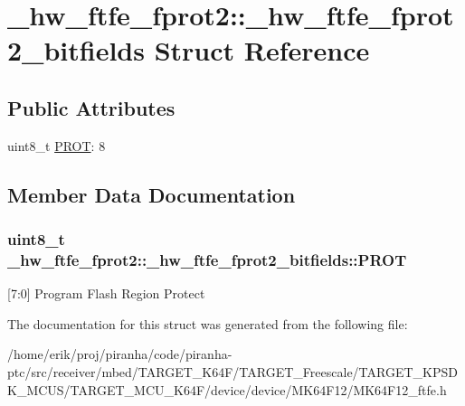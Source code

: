 \hypertarget{struct__hw__ftfe__fprot2_1_1__hw__ftfe__fprot2__bitfields}{}\section{\+\_\+hw\+\_\+ftfe\+\_\+fprot2\+:\+:\+\_\+hw\+\_\+ftfe\+\_\+fprot2\+\_\+bitfields Struct Reference}
\label{struct__hw__ftfe__fprot2_1_1__hw__ftfe__fprot2__bitfields}
\subsection*{Public Attributes}
\begin{DoxyCompactItemize}
\item 
uint8\+\_\+t \hyperlink{struct__hw__ftfe__fprot2_1_1__hw__ftfe__fprot2__bitfields_acb5dd7d941ff90e8c78784e72163ed5f}{P\+R\+OT}\+: 8
\end{DoxyCompactItemize}


\subsection{Member Data Documentation}
\subsubsection[{\texorpdfstring{P\+R\+OT}{PROT}}]{\setlength{\rightskip}{0pt plus 5cm}uint8\+\_\+t \+\_\+hw\+\_\+ftfe\+\_\+fprot2\+::\+\_\+hw\+\_\+ftfe\+\_\+fprot2\+\_\+bitfields\+::\+P\+R\+OT}\hypertarget{struct__hw__ftfe__fprot2_1_1__hw__ftfe__fprot2__bitfields_acb5dd7d941ff90e8c78784e72163ed5f}{}\label{struct__hw__ftfe__fprot2_1_1__hw__ftfe__fprot2__bitfields_acb5dd7d941ff90e8c78784e72163ed5f}
\mbox{[}7\+:0\mbox{]} Program Flash Region Protect 

The documentation for this struct was generated from the following file\+:\begin{DoxyCompactItemize}
\item 
/home/erik/proj/piranha/code/piranha-\/ptc/src/receiver/mbed/\+T\+A\+R\+G\+E\+T\+\_\+\+K64\+F/\+T\+A\+R\+G\+E\+T\+\_\+\+Freescale/\+T\+A\+R\+G\+E\+T\+\_\+\+K\+P\+S\+D\+K\+\_\+\+M\+C\+U\+S/\+T\+A\+R\+G\+E\+T\+\_\+\+M\+C\+U\+\_\+\+K64\+F/device/device/\+M\+K64\+F12/M\+K64\+F12\+\_\+ftfe.\+h\end{DoxyCompactItemize}
